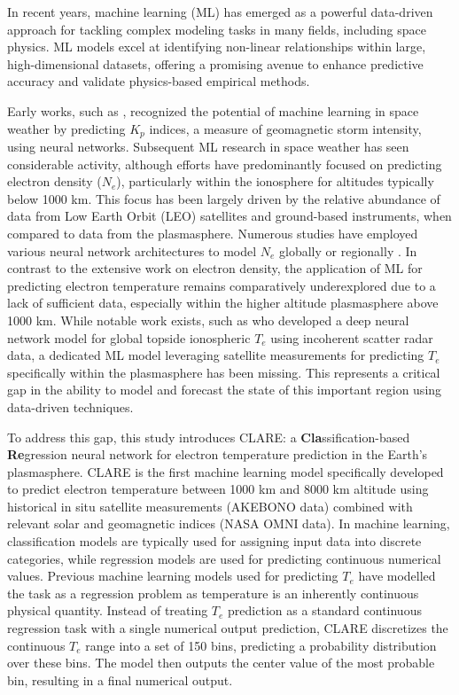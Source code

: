 \documentclass{agujournal2019}
\begin{document}
In recent years, machine learning (ML) has emerged as a powerful data-driven approach for tackling complex modeling tasks in many fields, including space physics. ML models excel at identifying non-linear relationships within large, high-dimensional datasets, offering a promising avenue to enhance predictive accuracy and validate physics-based empirical methods.

Early works, such as \cite{wing_kp_2005}, recognized the potential of machine learning in space weather by predicting $K_p$ indices, a measure of geomagnetic storm intensity, using neural networks. Subsequent ML research in space weather has seen considerable activity, although efforts have predominantly focused on predicting electron density ($N_e$), particularly within the ionosphere for altitudes typically below 1000 km. This focus has been largely driven by the relative abundance of data from Low Earth Orbit (LEO) satellites and ground-based instruments, when compared to data from the plasmasphere. Numerous studies have employed various neural network architectures to model $N_e$ globally or regionally \citep{chu_neural_2017, zhelavskaya_empirical_2017, li_application_2021}.
In contrast to the extensive work on electron density, the application of ML for predicting electron temperature remains comparatively underexplored due to a lack of sufficient data, especially within the higher altitude plasmasphere above 1000 km. While notable work exists, such as \cite{hu_deep_2020} who developed a deep neural network model for global topside ionospheric $T_e$ using incoherent scatter radar data, a dedicated ML model leveraging satellite measurements for predicting $T_e$ specifically within the plasmasphere has been missing. This represents a critical gap in the ability to model and forecast the state of this important region using data-driven techniques.

To address this gap, this study introduces CLARE: a \textbf{Cla}ssification-based \textbf{Re}gression neural network for electron temperature prediction in the Earth's plasmasphere. CLARE is the first machine learning model specifically developed to predict electron temperature between 1000 km and 8000 km altitude using historical in situ satellite measurements (AKEBONO data) combined with relevant solar and geomagnetic indices (NASA OMNI data). In machine learning, classification models are typically used for assigning input data into discrete categories, while regression models are used for predicting continuous numerical values. Previous machine learning models used for predicting $T_e$ have modelled the task as a regression problem as temperature is an inherently continuous physical quantity. Instead of treating $T_e$ prediction as a standard continuous regression task with a single numerical output prediction, CLARE discretizes the continuous $T_e$ range into a set of 150 bins, predicting a probability distribution over these bins. The model then outputs the center value of the most probable bin, resulting in a final numerical output.
\end{document}
